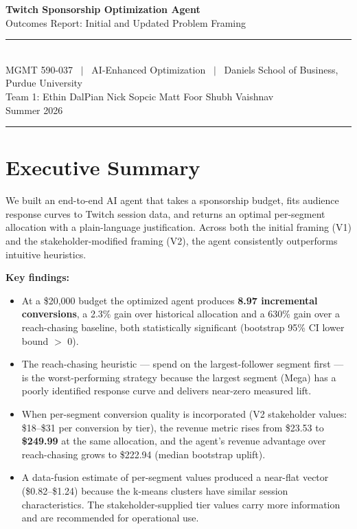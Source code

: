 \documentclass[11pt,letterpaper]{article}
\begin{document}
\thispagestyle{empty}

\begin{center}
  {\Large\bfseries\color{navy} Twitch Sponsorship Optimization Agent}\\[4pt]
  {\large\color{navy} Outcomes Report: Initial and Updated Problem Framing}\\[8pt]
  \textcolor{gold}{\rule{0.6\linewidth}{1.5pt}}\\[8pt]
  {\normalsize MGMT 590-037 \ $|$ \ AI-Enhanced Optimization \ $|$
   \ Daniels School of Business, Purdue University}\\[4pt]
  {\normalsize Team 1: Ethin DalPian \quad Nick Sopcic \quad Matt Foor \quad Shubh Vaishnav}\\[4pt]
  {\normalsize Summer 2026}
\end{center}

\vspace{6pt}
\textcolor{gold}{\rule{\linewidth}{1pt}}

\section*{Executive Summary}
\vspace{-2pt}

We built an end-to-end AI agent that takes a sponsorship budget, fits audience
response curves to Twitch session data, and returns an optimal per-segment
allocation with a plain-language justification. Across both the initial framing
(V1) and the stakeholder-modified framing (V2), the agent consistently
outperforms intuitive heuristics.

\textbf{Key findings:}
\begin{itemize}[nosep, leftmargin=1.5em]
  \item At a \$20{,}000 budget the optimized agent produces \textbf{8.97
        incremental conversions}, a 2.3\% gain over historical allocation
        and a 630\% gain over a reach-chasing baseline, both statistically
        significant (bootstrap 95\% CI lower bound $>$ 0).
  \item The reach-chasing heuristic --- spend on the largest-follower
        segment first --- is the worst-performing strategy because the
        largest segment (Mega) has a poorly identified response curve and
        delivers near-zero measured lift.
  \item When per-segment conversion quality is incorporated (V2 stakeholder
        values: \$18--\$31 per conversion by tier), the revenue metric rises
        from \$23.53 to \textbf{\$249.99} at the same allocation, and the
        agent's revenue advantage over reach-chasing grows to \$222.94
        (median bootstrap uplift).
  \item A data-fusion estimate of per-segment values produced a near-flat
        vector (\$0.82--\$1.24) because the k-means clusters have similar
        session characteristics. The stakeholder-supplied tier values carry
        more information and are recommended for operational use.
\end{itemize}
\end{document}
